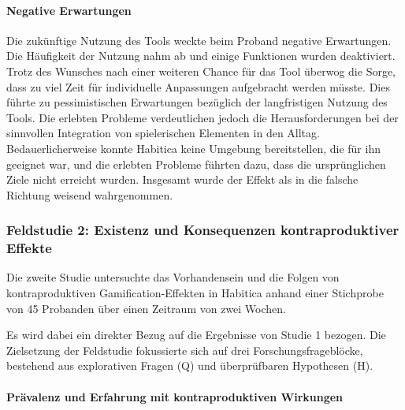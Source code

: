 \documentclass[sigconf, nonacm]{acmart}
\begin{document}
\paragraph{Negative Erwartungen}\label{sec:sr3}
Die zukünftige Nutzung des Tools weckte beim Proband negative Erwartungen. Die Häufigkeit der Nutzung nahm ab und einige Funktionen wurden deaktiviert. Trotz des Wunsches nach einer weiteren Chance für das Tool überwog die Sorge, dass zu viel Zeit für individuelle Anpassungen aufgebracht werden müsste. Dies führte zu pessimistischen Erwartungen bezüglich der langfristigen Nutzung des Tools. Die erlebten Probleme verdeutlichen jedoch die Herausforderungen bei der sinnvollen Integration von spielerischen Elementen in den Alltag. Bedauerlicherweise konnte Habitica keine Umgebung bereitstellen, die für ihn geeignet war, und die erlebten Probleme führten dazu, dass die ursprünglichen Ziele nicht erreicht wurden. Insgesamt wurde der Effekt als in die falsche Richtung weisend wahrgenommen.

\subsubsection{Feldstudie 2: Existenz und Konsequenzen kontraproduktiver Effekte}
Die zweite Studie untersuchte das Vorhandensein und die Folgen von kontraproduktiven Gamification-Effekten in Habitica anhand einer Stichprobe von 45 Probanden über einen Zeitraum von zwei Wochen.

Es wird dabei ein direkter Bezug auf die Ergebnisse von Studie 1 bezogen. Die Zielsetzung der Feldstudie fokussierte sich auf drei Forschungsfrageblöcke, bestehend aus explorativen Fragen (Q) und überprüfbaren Hypothesen (H).

\paragraph{Prävalenz und Erfahrung mit kontraproduktiven Wirkungen}

\end{document}

